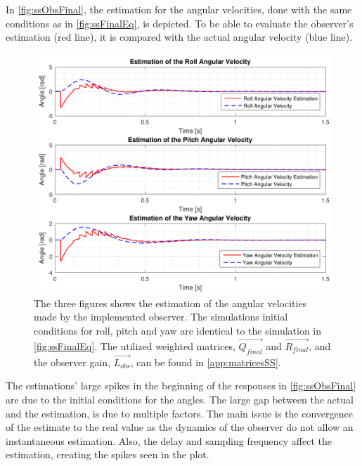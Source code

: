 In \autoref{fig:ssObsFinal}, the estimation for the angular velocities, done with the same conditions as in \autoref{fig:ssFinalEq}, is depicted. To be able to evaluate the observer's estimation (red line), it is compared with the actual angular velocity (blue line). 

\begin{figure}[H]
	\centering
	\includegraphics[scale=0.7]{figures/ssObsFinal.pdf}
	\caption{The three figures shows the estimation of the angular velocities made by the implemented observer. The simulations initial conditions for roll, pitch and yaw are identical to the simulation in \autoref{fig:ssFinalEq}. The utilized weighted matrices, $\vec{Q_{final}}$ and $\vec{R_{final}}$, and the observer gain, $\vec{L_{obs}}$, can be found in \autoref{app:matricesSS}. }
	\label{fig:ssObsFinal}
\end{figure}
%
The estimations' large spikes in the beginning of the responses in \autoref{fig:ssObsFinal} are due to the initial conditions for the angles. The large gap between the actual and the estimation, is due to multiple factors. The main issue is the convergence of the estimate to the real value as the dynamics of the observer do not allow an instantaneous estimation. Also, the delay and sampling frequency affect the estimation, creating the spikes seen in the plot. %

